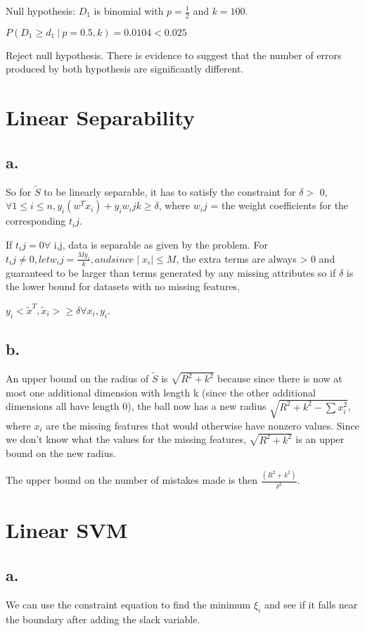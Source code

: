 \documentclass[]{article}
\begin{document}
Null hypothesis: $D_1$ is binomial with $p=\frac{1}{2}$ and $k=100$.

$P(D_1 \ge d_1~|~p = 0.5, k) = 0.0104 < 0.025$

Reject null hypothesis. There is evidence to suggest that the number of errors produced by both hypothesis are significantly different.


\section{Linear Separability}
\subsection{a.}
So for $\tilde S$ to be linearly separable, it has to satisfy the constraint for $\delta >$ 0, $\forall 1\leq i\leq n, y_i\left(w^T x_i\right) + y_i w_ij k \geq \delta$, where $w_ij$ = the weight coefficients for the corresponding $t_ij$. 

If $t_ij = 0 \forall$ i,j, data is separable as given by the problem.
For $t_ij \neq 0, let w_ij = \frac{M y_i}{k}, and since \mid x_i \mid \leq M$, the extra terms are always > 0 and guaranteed to be larger than terms generated by any missing attributes so if $\delta$ is the lower bound for datasets with no missing features,

$y_i<\tilde x^T, \tilde x_i> \geq \delta \forall x_i,y_i$.

\subsection{b.}
An upper bound on the radius of $\tilde S$ is $\sqrt{R^{2} + k^{2}}$ because since there is now at most one additional dimension with length k (since the other additional dimensions all have length 0), the ball now has a new radius
$\sqrt{R^{2} + k^{2} - \sum x_{i}^{2}}$, where $x_{i}$ are the missing features that would otherwise have nonzero values. Since we don't know what the values for the missing features, $\sqrt{R^{2} + k^{2}}$ is an upper bound on the new radius.

The upper bound on the number of mistakes made is then $\frac{(R^{2} + k^{2})}{\delta^2}$.

\section{Linear SVM}

\subsection{a.}
We can use the constraint equation to find the minimum $\xi_i$ and see if it falls near the boundary after adding the slack variable.
\end{document}
